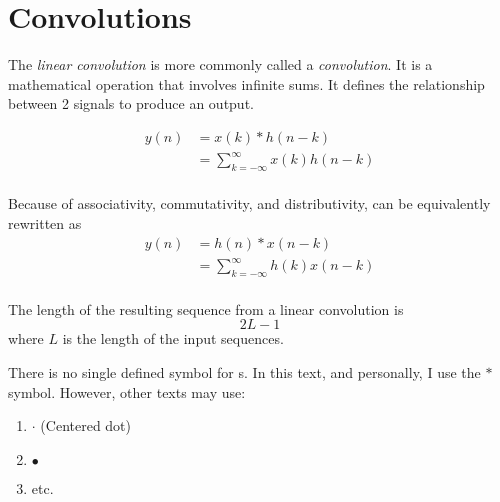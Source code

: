 \section{Convolutions}\label{sec:Convolutions}
\begin{definition}\label{def:Linear_Convolution}
  The \emph{linear convolution} is more commonly called a \emph{convolution}.
  It is a mathematical operation that involves infinite sums.
  It defines the relationship between 2 signals to produce an output.

  \begin{equation}\label{eq:Linear_Convolution-1}
    \begin{aligned}
      y(n) &= x(k) * h(n-k) \\
      &= \sum\limits_{k=-\infty}^{\infty} x(k) h(n-k) \\
    \end{aligned}
  \end{equation}

  Because of associativity, commutativity, and distributivity,  can be equivalently rewritten as
  \begin{equation}\label{eq:Linear_Convolution-2}
    \begin{aligned}
      y(n) &= h(n) * x(n-k) \\
      &= \sum\limits_{k=-\infty}^{\infty} h(k) x(n-k) \\
    \end{aligned}
  \end{equation}

  The length of the resulting sequence from a linear convolution is
  \begin{equation}\label{eq:Linear_Convolution_Length}
    2L-1
  \end{equation}
  where $L$ is the length of the input sequences.

  \begin{remark}
    There is no single defined symbol for s.
    In this text, and personally, I use the $*$ symbol.
    However, other texts may use:
    \begin{enumerate}[noitemsep]
    \item $\cdot$ (Centered dot)
    \item $\bullet$
    \item etc.
    \end{enumerate}
  \end{remark}
\end{definition}

